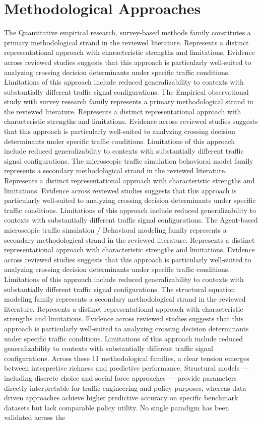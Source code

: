 \documentclass{article}
\begin{document}
\section{Methodological Approaches}
The Quantitative empirical research, survey-based methods family constitutes a primary methodological strand in the reviewed literature. Represents a distinct representational approach with characteristic strengths and limitations. Evidence across reviewed studies suggests that this approach is particularly well-suited to analyzing crossing decision determinants under specific traffic conditions. Limitations of this approach include reduced generalizability to contexts with substantially different traffic signal configurations. The Empirical observational study with survey research family represents a primary methodological strand in the reviewed literature. Represents a distinct representational approach with characteristic strengths and limitations. Evidence across reviewed studies suggests that this approach is particularly well-suited to analyzing crossing decision determinants under specific traffic conditions. Limitations of this approach include reduced generalizability to contexts with substantially different traffic signal configurations. The microscopic traffic simulation behavioral model family represents a secondary methodological strand in the reviewed literature. Represents a distinct representational approach with characteristic strengths and limitations. Evidence across reviewed studies suggests that this approach is particularly well-suited to analyzing crossing decision determinants under specific traffic conditions. Limitations of this approach include reduced generalizability to contexts with substantially different traffic signal configurations. The Agent-based microscopic traffic simulation / Behavioral modeling family represents a secondary methodological strand in the reviewed literature. Represents a distinct representational approach with characteristic strengths and limitations. Evidence across reviewed studies suggests that this approach is particularly well-suited to analyzing crossing decision determinants under specific traffic conditions. Limitations of this approach include reduced generalizability to contexts with substantially different traffic signal configurations. The structural equation modeling family represents a secondary methodological strand in the reviewed literature. Represents a distinct representational approach with characteristic strengths and limitations. Evidence across reviewed studies suggests that this approach is particularly well-suited to analyzing crossing decision determinants under specific traffic conditions. Limitations of this approach include reduced generalizability to contexts with substantially different traffic signal configurations. Across these 11 methodological families, a clear tension emerges between interpretive richness and predictive performance. Structural models — including discrete choice and social force approaches — provide parameters directly interpretable for traffic engineering and policy purposes, whereas data-driven approaches achieve higher predictive accuracy on specific benchmark datasets but lack comparable policy utility. No single paradigm has been validated across the 
\end{document}
